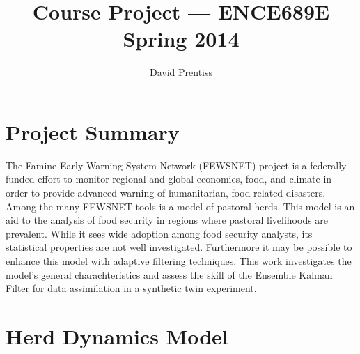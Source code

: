 \documentclass[fleqn, letterpaper]{amsart}
\title{Course Project --- ENCE689E Spring 2014}
\author{David Prentiss}
\begin{document}
\maketitle

\section{Project Summary}

The Famine Early Warning System Network (FEWSNET) project is a federally funded effort to monitor regional and global economies, food, and climate in order to provide advanced warning of humanitarian, food related disasters.
Among the many FEWSNET tools is a model of pastoral herds. This model is an aid to the analysis of food security in regions where pastoral livelihoods are prevalent. While it sees wide adoption among food security analysts, its statistical properties are not well investigated. Furthermore it may be possible to enhance this model with adaptive filtering techniques. This work investigates the model's general charachteristics and assess the skill of the Ensemble Kalman Filter for data assimilation in a synthetic twin experiment.

\section{Herd Dynamics Model}
\end{document}

